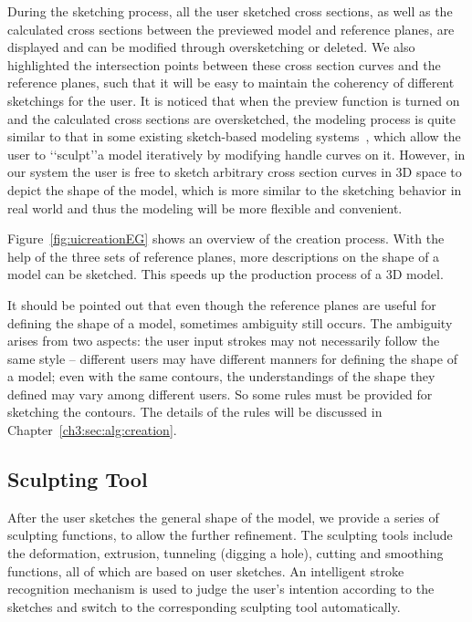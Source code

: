 During the sketching process, all the user sketched cross sections, as well as the calculated cross sections between the previewed model and reference planes, are displayed and can be modified through oversketching or deleted. We also highlighted the intersection points between these cross section curves and the reference planes, such that it will be easy to maintain the coherency of different sketchings for the user. It is noticed that when the preview 
function is  turned on and the calculated cross sections are oversketched, the modeling process is quite similar to that in some existing sketch-based modeling systems~\cite{NISA07,MI07,SWS10}, which allow the user to \lq\lq{sculpt}\rq\rq a model iteratively by modifying handle curves on it. However, in our system the user is free to sketch arbitrary cross section curves in 3D space to depict the shape of the model, which is more similar to the sketching behavior in real world and thus the modeling will be more flexible and convenient.

Figure~\ref{fig:uicreationEG} shows an overview of the creation process. With the help of the three sets of reference planes, more descriptions on the shape of a model can be sketched. This speeds up the production process of a 3D model.

It should be pointed out that even though the reference planes are useful for defining the shape of a model, sometimes ambiguity still occurs. The ambiguity arises from two aspects: the user input strokes may not necessarily follow the same style -- different users may have different manners for defining the shape of a model; even with the same contours, the understandings of the shape they defined may vary among different users. So some rules must be provided for sketching the contours. The details of the rules will be discussed in Chapter~\ref{ch3:sec:alg:creation}.


\subsection{Sculpting Tool}\label{ch3:sec:ui:sculpt}

After the user sketches the general shape of the model, we provide a series of sculpting functions, to allow the further refinement. The sculpting tools include the deformation, extrusion, tunneling (digging a hole), cutting and smoothing functions, all of which are based on user sketches. An intelligent stroke recognition mechanism is used to judge the user's intention according to the sketches and switch to the corresponding sculpting tool automatically.

